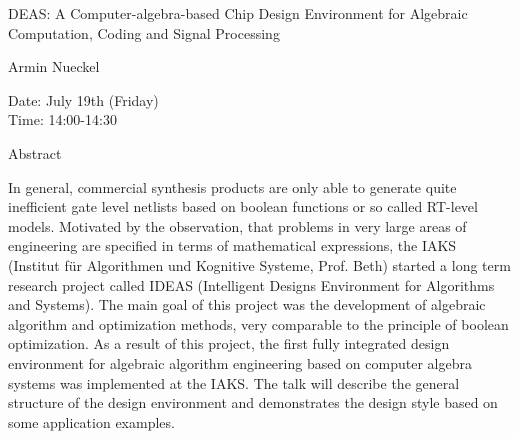 \begin{center}
\LARGE
DEAS: A Computer-algebra-based Chip Design
 Environment for Algebraic Computation, Coding and Signal
                           Processing 
\end{center}

\begin{center}
\Large
Armin Nueckel
\end{center}

\noindent
Date:  July 19th (Friday)\\
Time: 14:00-14:30\\

\begin{center}
\large
Abstract
\end{center}

In general, commercial synthesis products are only able to generate quite inefficient gate level
netlists based on boolean functions or so called RT-level models. Motivated by the observation,
that problems in very large areas of engineering are specified in terms of mathematical
expressions, the IAKS (Institut f\"ur Algorithmen und Kognitive Systeme, Prof. Beth) started a long
term research project called IDEAS (Intelligent Designs Environment for Algorithms and
Systems). The main goal of this project was the development of algebraic algorithm and
optimization methods, very comparable to the principle of boolean optimization. As a result of
this project, the first fully integrated design environment for algebraic algorithm engineering
based on computer algebra systems was implemented at the IAKS. The talk will describe the
general structure of the design environment and demonstrates the design style based on some
application examples. 

